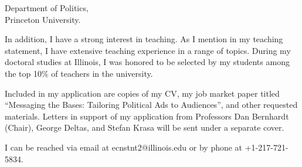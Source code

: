\documentclass[12pt]{letter}
\begin{document}
\begin{letter}{Department of Politics,\\
Princeton University.}

In addition, I have a strong interest in teaching.
As I mention in my teaching statement, I have extensive teaching experience in a range of topics.
During my doctoral studies at Illinois, I was honored to be selected by my students among the top 10\% of teachers in the university.



Included in my application are copies of my CV, my job market paper titled ``Messaging the Bases: Tailoring Political Ads to Audiences'',
and other requested materials.
Letters in support of my application from Professors Dan Bernhardt (Chair), George Deltas, and Stefan Krasa will be sent under a separate cover. 






I can be reached via email at ecnstnt2@illinois.edu or by phone at +1-217-721-5834.


\end{letter}
\end{document}
